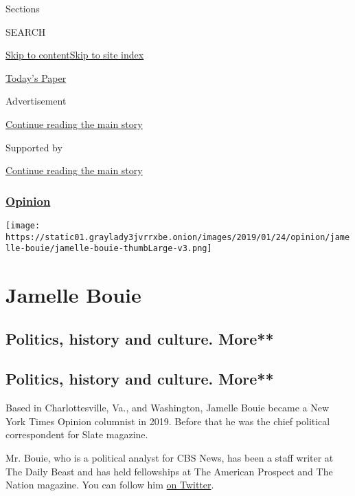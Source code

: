 Sections

SEARCH

\protect\hyperlink{site-content}{Skip to
content}\protect\hyperlink{site-index}{Skip to site index}

\href{https://myaccount.nytimes3xbfgragh.onion/auth/login?response_type=cookie\&client_id=vi}{}

\href{https://www.nytimes3xbfgragh.onion/section/todayspaper}{Today's
Paper}

Advertisement

\protect\hyperlink{after-top}{Continue reading the main story}

Supported by

\protect\hyperlink{after-sponsor}{Continue reading the main story}

\hypertarget{opinion}{%
\subsubsection{\texorpdfstring{\href{/section/opinion}{Opinion}}{Opinion}}\label{opinion}}

\texttt{[image: https://static01.graylady3jvrrxbe.onion/images/2019/01/24/opinion/jamelle-bouie/jamelle-bouie-thumbLarge-v3.png]}

\hypertarget{jamelle-bouie}{%
\section{Jamelle Bouie}\label{jamelle-bouie}}

\hypertarget{politics-history-and-culture-more}{%
\subsection{Politics, history and culture.
More**}\label{politics-history-and-culture-more}}

\hypertarget{politics-history-and-culture-more-1}{%
\subsection{Politics, history and culture.
More**}\label{politics-history-and-culture-more-1}}

Based in Charlottesville, Va., and Washington, Jamelle Bouie became a
New York Times Opinion columnist in 2019. Before that he was the chief
political correspondent for Slate magazine.

Mr. Bouie, who is a political analyst for CBS News, has been a staff
writer at The Daily Beast and has held fellowships at The American
Prospect and The Nation magazine. You can follow him
\href{https://twitter.com/jbouie}{on Twitter}.

